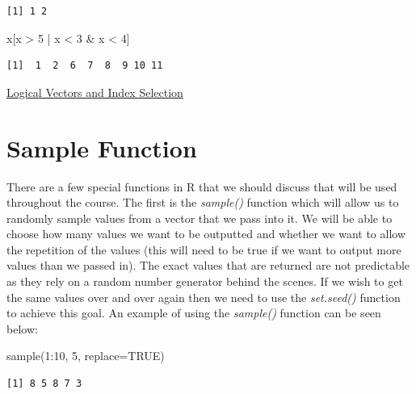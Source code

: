 \documentclass[
  letterpaper,
  DIV=11,
  numbers=noendperiod]{scrreprt}
\newenvironment{Shaded}{\begin{snugshade}}{\end{snugshade}}
\newcommand{\AttributeTok}[1]{\textcolor[rgb]{0.40,0.45,0.13}{#1}}
\newcommand{\ConstantTok}[1]{\textcolor[rgb]{0.56,0.35,0.01}{#1}}
\newcommand{\DecValTok}[1]{\textcolor[rgb]{0.68,0.00,0.00}{#1}}
\newcommand{\FunctionTok}[1]{\textcolor[rgb]{0.28,0.35,0.67}{#1}}
\newcommand{\NormalTok}[1]{\textcolor[rgb]{0.00,0.23,0.31}{#1}}
\newcommand{\SpecialCharTok}[1]{\textcolor[rgb]{0.37,0.37,0.37}{#1}}
\begin{document}
\begin{verbatim}
[1] 1 2
\end{verbatim}

\begin{Shaded}
\begin{Highlighting}[]
\NormalTok{x[x }\SpecialCharTok{\textgreater{}} \DecValTok{5} \SpecialCharTok{|}\NormalTok{ x }\SpecialCharTok{\textless{}} \DecValTok{3} \SpecialCharTok{\&}\NormalTok{ x }\SpecialCharTok{\textless{}} \DecValTok{4}\NormalTok{]}
\end{Highlighting}
\end{Shaded}

\begin{verbatim}
[1]  1  2  6  7  8  9 10 11
\end{verbatim}

\begin{watch}{}{}
    \href{https://youtu.be/QIrSEcEYRVk}{Logical Vectors and Index Selection}
\end{watch}

\section{Sample Function}\label{sample-function}

There are a few special functions in R that we should discuss that will
be used throughout the course. The first is the \emph{sample()} function
which will allow us to randomly sample values from a vector that we pass
into it. We will be able to choose how many values we want to be
outputted and whether we want to allow the repetition of the values
(this will need to be true if we want to output more values than we
passed in). The exact values that are returned are not predictable as
they rely on a random number generator behind the scenes. If we wish to
get the same values over and over again then we need to use the
\emph{set.seed()} function to achieve this goal. An example of using the
\emph{sample()} function can be seen below:

\begin{Shaded}
\begin{Highlighting}[]
\FunctionTok{sample}\NormalTok{(}\DecValTok{1}\SpecialCharTok{:}\DecValTok{10}\NormalTok{, }\DecValTok{5}\NormalTok{, }\AttributeTok{replace=}\ConstantTok{TRUE}\NormalTok{)}
\end{Highlighting}
\end{Shaded}

\begin{verbatim}
[1] 8 5 8 7 3
\end{verbatim}
\end{document}
